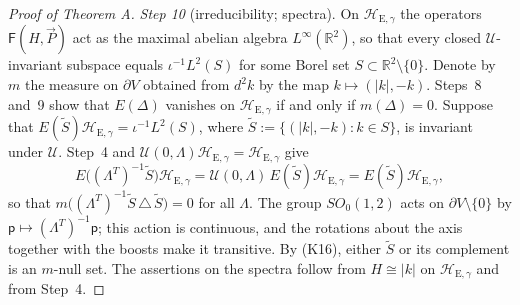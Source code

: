 \documentclass[11pt]{amsart}
\theoremstyle{definition}
\begin{document}
\begin{proof}[Proof of Theorem A]
\emph{Step 10} (irreducibility; spectra).
On $\mathcal H_{\mathrm E,\gamma}$ the operators $\mathsf F(H,\vec P)$ act as the maximal abelian algebra $L^\infty(\mathbb R^2)$, so that every closed $\mathcal U$-invariant subspace equals $\iota^{-1}L^2(S)$ for some Borel set $S\subset\mathbb R^2\setminus\{0\}$.
Denote by $m$ the measure on $\partial V$ obtained from $d^2k$ by the map $k\mapsto(|k|,-k)$.
Steps~8 and~9 show that $E(\Delta)$ vanishes on $\mathcal H_{\mathrm E,\gamma}$ if and only if $m(\Delta)=0$.
Suppose that $E(\tilde S)\mathcal H_{\mathrm E,\gamma}=\iota^{-1}L^2(S)$, where $\tilde S:=\{(|k|,-k):k\in S\}$, is invariant under $\mathcal U$.
Step~4 and $\mathcal U(0,\Lambda)\mathcal H_{\mathrm E,\gamma}=\mathcal H_{\mathrm E,\gamma}$ give
\begin{equation*}
E\bigl((\Lambda^T)^{-1}\tilde S\bigr)\mathcal H_{\mathrm E,\gamma}=\mathcal U(0,\Lambda)\,E(\tilde S)\mathcal H_{\mathrm E,\gamma}=E(\tilde S)\mathcal H_{\mathrm E,\gamma},
\end{equation*}
so that $m\bigl((\Lambda^T)^{-1}\tilde S\,\triangle\,\tilde S\bigr)=0$ for all $\Lambda$.
The group $SO_0(1,2)$ acts on $\partial V\setminus\{0\}$ by $\mathsf p\mapsto(\Lambda^T)^{-1}\mathsf p$;
this action is continuous, and the rotations about the axis together with the boosts make it transitive.
By (K16), either $\tilde S$ or its complement is an $m$-null set.
The assertions on the spectra follow from $H\cong|k|$ on $\mathcal H_{\mathrm E,\gamma}$ and from Step~4.


\end{proof}
\end{document}
